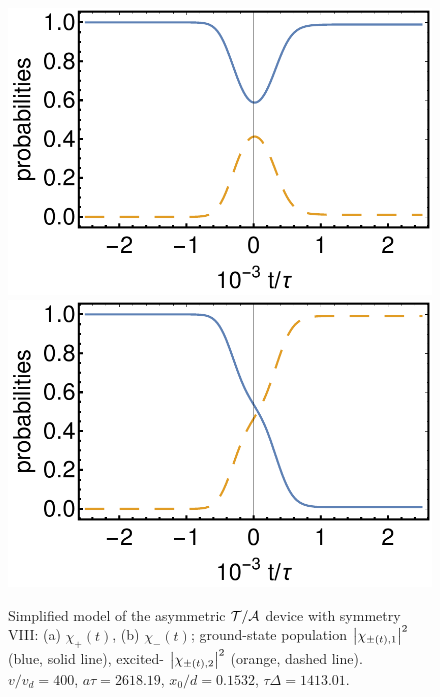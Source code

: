 \begin{figure}
  \begin{center}
  \includegraphics[width=0.48\linewidth]{Figures/asym_fig_t_a_approx_left.pdf}
  \includegraphics[width=0.48\linewidth]{Figures/asym_fig_t_a_approx_right.pdf}
  \end{center}
  \caption{Simplified model of the asymmetric ${\cal T/A}$ device with symmetry VIII: (a) $\chi_+(t)$, (b) $\chi_-(t)$; ground-state population $\left| \chi_{\pm(t),1} \right|^2$ (blue, solid line), excited-
  $\left| \chi_{\pm(t),2} \right|^2$ (orange, dashed line). $v/v_d = 400$, $a\tau = 2618.19$,
  $x_0/d = 0.1532$, $\tau\Delta = 1413.01$.
  \label{fig_t_a_approx}}
\end{figure}

